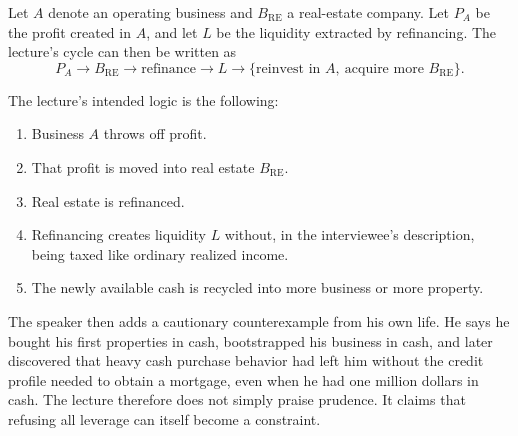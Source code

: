 Let \(A\) denote an operating business and \(B_{\mathrm{RE}}\) a real-estate company. Let \(P_A\) be the profit created in \(A\), and let \(L\) be the liquidity extracted by refinancing. The lecture's cycle can then be written as
\begin{equation}
P_A \to B_{\mathrm{RE}} \to \text{refinance} \to L \to \{\text{reinvest in }A,\ \text{acquire more }B_{\mathrm{RE}}\}.
\end{equation}

\begin{figure}
\centering
{}
\end{figure}

The lecture's intended logic is the following:
\begin{enumerate}
\item Business \(A\) throws off profit.
\item That profit is moved into real estate \(B_{\mathrm{RE}}\).
\item Real estate is refinanced.
\item Refinancing creates liquidity \(L\) without, in the interviewee's description, being taxed like ordinary realized income.
\item The newly available cash is recycled into more business or more property.
\end{enumerate}

The speaker then adds a cautionary counterexample from his own life. He says he bought his first properties in cash, bootstrapped his business in cash, and later discovered that heavy cash purchase behavior had left him without the credit profile needed to obtain a mortgage, even when he had one million dollars in cash. The lecture therefore does not simply praise prudence. It claims that refusing all leverage can itself become a constraint.

